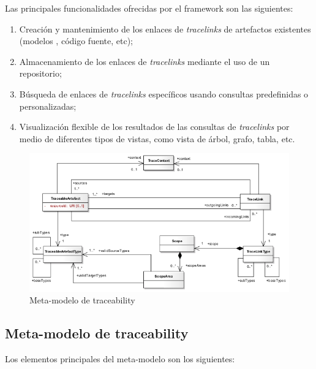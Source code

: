 \documentclass[a4paper,12pt,twoside,spanish,openright]{book}
\begin{document}
Las principales funcionalidades ofrecidas por el framework son las siguientes:

\begin{enumerate}
\item Creación y mantenimiento de los enlaces de \textit{tracelinks} de artefactos existentes (modelos , código fuente, etc);
\item Almacenamiento de los enlaces de \textit{tracelinks} mediante el uso de un repositorio;
\item Búsqueda de enlaces de \textit{tracelinks} específicos usando consultas predefinidas o personalizadas;
\item Visualización flexible de los resultados de las consultas de \textit{tracelinks} por medio de diferentes tipos de vistas, como vista de árbol, grafo, tabla, etc.
\end{enumerate}

\begin{figure}[hbtp]
\centering
\includegraphics[scale=.62]{./img/Traceability_Metamodel}
\caption{Meta-modelo de traceability}
\label{fig:SPLMeta-modelo}
\end{figure}

\subsection{Meta-modelo de traceability}

Los elementos principales del meta-modelo son los siguientes:
\end{document}
